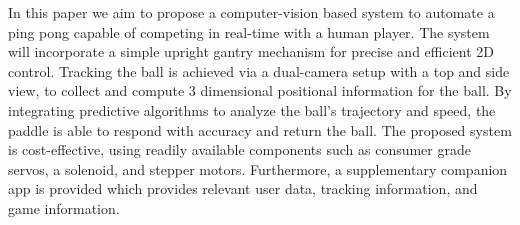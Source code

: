 In this paper we aim to propose a computer-vision based system to automate a ping pong capable of competing in real-time with a human player. The system will incorporate a simple upright gantry mechanism for precise and efficient 2D control. Tracking the ball is achieved via a dual-camera setup with a top and side view, to collect and compute 3 dimensional positional information for the ball. By integrating predictive algorithms to analyze the ball's trajectory and speed, the paddle is able to respond with accuracy and return the ball. The proposed system is cost-effective, using readily available components such as consumer grade servos, a solenoid, and stepper motors. Furthermore, a supplementary companion app is provided which provides relevant user data, tracking information, and game information.